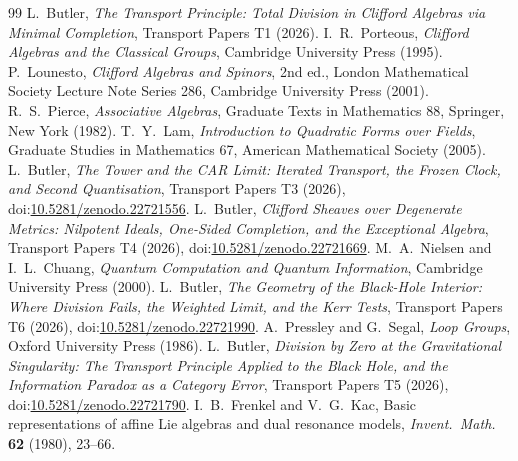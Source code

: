 \documentclass[11pt]{article}
\theoremstyle{definition}
\theoremstyle{plain}
\begin{document}
\begin{thebibliography}{99}
 L.~Butler,
\emph{The Transport Principle: Total Division in Clifford Algebras via Minimal Completion},
Transport Papers T1 (2026).
 I.~R.~Porteous,
\emph{Clifford Algebras and the Classical Groups},
Cambridge University Press (1995).
 P.~Lounesto,
\emph{Clifford Algebras and Spinors}, 2nd ed.,
London Mathematical Society Lecture Note Series 286, Cambridge University Press (2001).
 R.~S.~Pierce,
\emph{Associative Algebras},
Graduate Texts in Mathematics 88, Springer, New York (1982).
 T.~Y.~Lam,
\emph{Introduction to Quadratic Forms over Fields},
Graduate Studies in Mathematics 67, American Mathematical Society (2005).
 L.~Butler,
\emph{The Tower and the CAR Limit: Iterated Transport, the Frozen Clock, and Second Quantisation},
Transport Papers T3 (2026), doi:\href{https://doi.org/10.5281/zenodo.22721556}{10.5281/zenodo.22721556}.
 L.~Butler,
\emph{Clifford Sheaves over Degenerate Metrics: Nilpotent Ideals, One-Sided Completion, and the Exceptional Algebra},
Transport Papers T4 (2026), doi:\href{https://doi.org/10.5281/zenodo.22721669}{10.5281/zenodo.22721669}.
 M.~A.~Nielsen and I.~L.~Chuang,
\emph{Quantum Computation and Quantum Information},
Cambridge University Press (2000).
 L.~Butler,
\emph{The Geometry of the Black-Hole Interior: Where Division Fails, the Weighted Limit, and the Kerr Tests},
Transport Papers T6 (2026), doi:\href{https://doi.org/10.5281/zenodo.22721990}{10.5281/zenodo.22721990}.
 A.~Pressley and G.~Segal,
\emph{Loop Groups},
Oxford University Press (1986).
 L.~Butler,
\emph{Division by Zero at the Gravitational Singularity: The Transport Principle Applied to the Black Hole, and the Information Paradox as a Category Error},
Transport Papers T5 (2026), doi:\href{https://doi.org/10.5281/zenodo.22721790}{10.5281/zenodo.22721790}.
 I.~B.~Frenkel and V.~G.~Kac,
Basic representations of affine Lie algebras and dual resonance models,
\emph{Invent.\ Math.} \textbf{62} (1980), 23--66.
\end{thebibliography}
\end{document}
